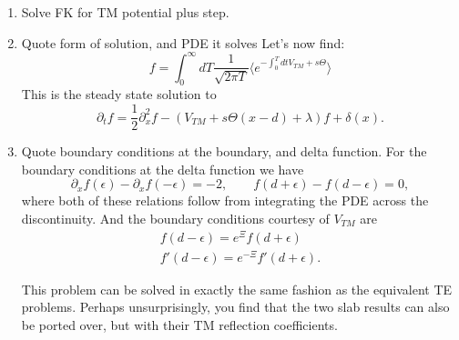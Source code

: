 \begin{enumerate}
  \item {Solve FK for TM potential plus step. }
  \item Quote form of solution, and PDE it solves
    Let's now find: 
    \begin{equation}
      f = \int_0^\infty dT \frac{1}{\sqrt{2\pi T}}\langle e^{-\int_0^T dt V_{TM} + s\Theta}\rangle 
    \end{equation}
    This is the steady state solution to 
    \begin{equation}
      \partial_t f = \frac{1}{2}\partial_x^2f -(V_{TM} + s\Theta(x-d)+\lambda)f +\delta(x). 
    \end{equation}

  \item Quote boundary conditions at the boundary, and delta function.  
    For the boundary conditions at the delta function we have 
    \begin{equation}
      \partial_xf(\epsilon) -\partial_x f(-\epsilon) = -2 , \qquad f(d+\epsilon)-f(d-\epsilon) = 0,
    \end{equation}
    where both of these relations follow from integrating the PDE across the discontinuity.
    And the boundary conditions courtesy of $V_{TM}$ are
    \begin{align}
      f(d-\epsilon) = e^{\Xi}f(d+\epsilon)\\
      f'(d-\epsilon) = e^{-\Xi}f'(d+\epsilon).
    \end{align}

    This problem can be solved in exactly the same fashion as the equivalent TE problems.
    Perhaps unsurprisingly, you find that the two slab results can also be ported over, but with their TM reflection coefficients.  


\end{enumerate}
